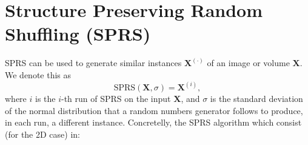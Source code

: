\documentclass{article}
\begin{document}

\section{Structure Preserving Random Shuffling (SPRS)}
\label{ape:SPRS}

SPRS can be used to generate similar instances $\mathbf{X}^{(\cdot)}$
of an image or volume $\mathbf{X}$. We denote this as
\begin{equation}
  \mathrm{SPRS}(\mathbf{X},\sigma)=\mathbf{X}^{(i)},
\end{equation}
where $i$ is the $i$-th run of SPRS on the input $\mathbf{X}$, and
$\sigma$ is the standard deviation of the normal distribution that a
random numbers generator follows to produce, in each run, a different
instance. Concretelly, the SPRS algorithm which consist (for the 2D
case) in:
\end{document}
